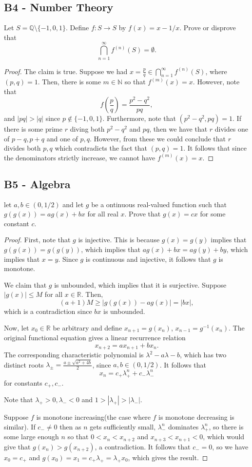 \documentclass[11pt]{scrartcl}
\newcommand{\N}{\mathbb{N}}
\newcommand{\Q}{\mathbb{Q}}
\newcommand{\R}{\mathbb{R}}
\newcommand{\<}{\langle}
\renewcommand{\>}{\rangle}
\begin{document}
\subsection{B4 - Number Theory}
 Let $S = \Q \setminus\{-1, 0, 1\}$.  Define $f: S \to S$ by $f(x) = x - 1/x$.  Prove or disprove that 
$$\bigcap_{n=1}^\infty f^{(n)}(S) = \emptyset.$$
\begin{proof}
The claim is true.  Suppose we had $x = \frac{p}{q} \in \bigcap_{n=1}^\infty f^{(n)}(S)$, where $(p, q) = 1$.  Then, there is some $m \in \N$ so that $f^{(m)}(x) = x$.  However, note that 
$$f\left(\frac{p}{q} \right) = \frac{p^2 - q^2}{pq},$$
and $|pq| > |q|$ since $p \not \in \{-1, 0, 1\}$.  Furthermore, note that $(p^2 - q^2, pq) = 1$.  If there is some prime $r$ diving both $p^2 - q^2$ and $pq$, then we have that $r$ divides one of $p-q, p+q$ and one of $p, q$.  However, from these we could conclude that $r$ divides both $p, q$ which contradicts the fact that $(p, q) = 1$.  It follows that since the denominators strictly increase, we cannot have $f^{(m)}(x) = x$.
\end{proof}
\pagebreak
\subsection{B5 - Algebra}
let $a, b \in (0, 1/2)$ and let $g$ be a ontinuous real-valued function such that $g(g(x)) = ag(x) + bx$ for all real $x$.  Prove that $g(x) = cx$ for some constant $c$.
\begin{proof}
First, note that $g$ is injective.  This is because $g(x) = g(y)$ implies that $g(g(x)) = g(g(y))$, which implies that $ag(x) + bx = ag(y) + by$, which implies that $x = y$.   Since $g$ is continuous and injective, it follows that $g$ is monotone. 

We claim that $g$ is unbounded, which implies that it is surjective.  Suppose $|g(x)| \le M$ for all $x \in \R$.  Then, 
$$(a+1)M \ge |g(g(x)) - ag(x)| = |bx|,$$
which is a contradiction since $bx$ is unbounded.  

Now, let $x_0 \in \R$ be arbitrary and define $x_{n+1} = g(x_n)$, $x_{n-1} = g^{-1}(x_n)$.  The original functional equation gives a linear recurrence relation
$$x_{n+2} = ax_{n+1} + bx_n.$$
The corresponding characteristic polynomial is $\lambda^2 - a\lambda - b$, which has two distinct roots $\lambda_{\pm} = \frac{a \pm \sqrt{a^2 + 4b}}{2}$, since $a, b \in (0, 1/2)$.   It follows that 
$$x_n = c_+ \lambda_+^n + c_- \lambda_-^n$$
for constants $c_+, c_-$.

Note that $\lambda_+ > 0, \lambda_- < 0$ and $1 > |\lambda_+| > |\lambda_-|$.  

Suppose $f$ is monotone increasing(the case where $f$ is monotone decreasing is similar).  If $c_- \ne 0$ then as $n$ gets sufficiently small, $\lambda_-^n$ dominates $\lambda_+^n$, so there is some large enough $n$ so that $0 < x_n < x_{n+2}$ and $x_{n+3} < x_{n+1} < 0$, which would give that $g(x_n) > g(x_{n+2})$, a contradiction.  It follows that $c_- = 0$, so we have $x_0 = c_+$ and $g(x_0) = x_1 =  c_+ \lambda_+ = \lambda_+ x_0$, which gives the result.  


\end{proof}
\pagebreak
\end{document}
